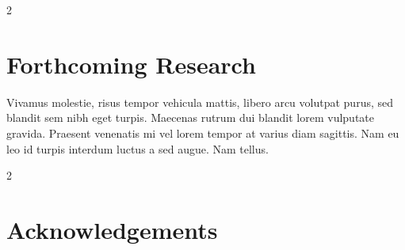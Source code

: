 \documentclass{article}
\begin{document}
\begin{multicols}{2}

\section*{Forthcoming Research}

Vivamus molestie, risus tempor vehicula mattis, libero arcu volutpat purus, sed blandit sem nibh eget turpis. Maecenas rutrum dui blandit lorem vulputate gravida. Praesent venenatis mi vel lorem tempor at varius diam sagittis. Nam eu leo id turpis interdum luctus a sed augue. Nam tellus.



\begin{small}%
\begin{multicols}{2}%
\nocite{*} %
\end{multicols}
\end{small}

\section*{Acknowledgements}


\end{multicols}
\end{document}
